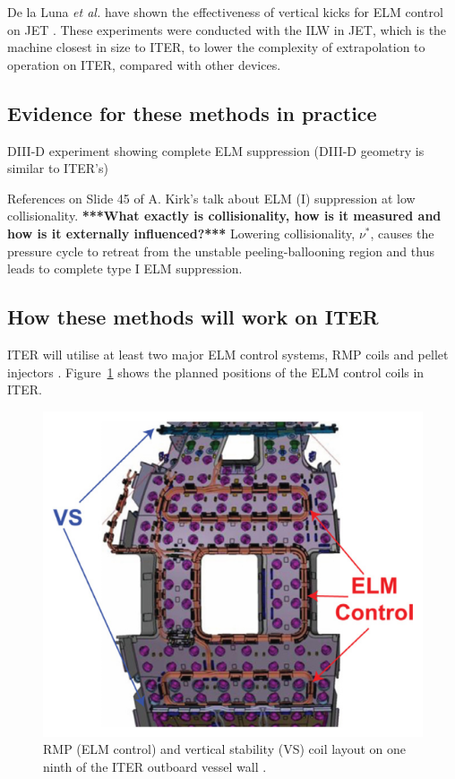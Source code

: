 \documentclass[12pt]{article}  %
\begin{document}
De la Luna \textit{et al.} have shown the effectiveness of vertical kicks for ELM control on JET \cite{DelaLuna2016}. These experiments were conducted with the ILW in JET, which is the machine closest in size to ITER, to lower the complexity of extrapolation to operation on ITER, compared with other devices. 



\subsection{Evidence for these methods in practice}\label{ssec:EIP}
DIII-D experiment showing complete ELM suppression (DIII-D geometry is similar to ITER's)\cite{Mordijck2011}

References on Slide 45 of A. Kirk's talk about ELM (I) suppression at low collisionality. \textbf{***What exactly is collisionality, how is it measured and how is it externally influenced?***} Lowering collisionality, $\nu^{*}$, causes the pressure cycle to retreat from the unstable peeling-ballooning region and thus leads to complete type I ELM suppression.\cite{Evans2008}


\subsection{How these methods will work on ITER}\label{ssec:onITER}
ITER will utilise at least two major ELM control systems, RMP coils and pellet injectors \cite{Loarte2010}. Figure~\ref{fig:ITERcoils} shows the planned positions of the ELM control coils in ITER.

\begin{figure}
\includegraphics[scale=0.5]{Figures/ITERcoils.png}
\centering
\caption{RMP (ELM control) and vertical stability (VS) coil layout on one ninth of the ITER outboard vessel wall \cite{Lang2013}.}\label{fig:ITERcoils}
\end{figure}
\end{document}
